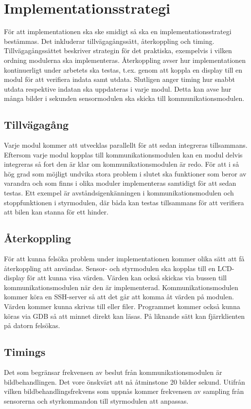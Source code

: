 \documentclass[designspec/spec.tex]{subfiles}
\begin{document}
\section{Implementationsstrategi}

För att implementationen ska ske smidigt så ska en implementationsstrategi
bestämmas. Det inkluderar tillvägagångssätt, återkoppling och timing.
Tillvägagångssättet beskriver strategin för det praktiska, exempelvis i vilken
ordning modulerna ska implementeras. Återkoppling avser hur implementationen
kontinuerligt under arbetets ska testas, t.ex. genom att koppla en display till
en modul för att verifiera indata samt utdata.
Slutligen anger timing hur snabbt utdata respektive indatan ska
uppdateras i varje modul. Detta kan avse hur många bilder i sekunden
sensormodulen ska skicka till kommunikationsmodulen. 

\subsection{Tillvägagång}
Varje modul kommer att utvecklas parallellt för att sedan integreras
tillsammans. Eftersom varje modul kopplas till kommunikationsmodulen kan en
modul delvis integreras så fort den är klar om kommunikationsmodulen är
redo. För att i så hög grad som möjligt undvika stora problem i slutet ska
funktioner som beror av varandra och som finns i olika moduler implementeras
samtidigt för att sedan testas. Ett exempel är avståndsigenkänningen i
kommunikationsmodulen och stoppfunktionen i styrmodulen, där båda kan testas
tillsammans för att verifiera att bilen kan stanna för ett hinder.

\subsection{Återkoppling}
För att kunna felsöka problem under implementationen kommer olika sätt att få
återkoppling att användas. Sensor- och styrmodulen ska kopplas till en
LCD-display för att kunna visa värden. Värden kan också skickas via bussen till
kommunikationsmodulen när den är implementerad. Kommunikationsmodulen kommer
köra en SSH-server så att det går att komma åt värden på modulen. Värden kommer
kunna skrivas till  eller filer. Programmet kommer också kunna
köras via GDB så att minnet direkt kan läsas. På liknande sätt kan
fjärrklienten på datorn felsökas.

\subsection{Timings}
Det som begränsar frekvensen av beslut från kommunikationsmodulen är
bildbehandlingen. Det vore önskvärt att nå åtminstone 20 bilder sekund. Utifrån
vilken bildbehandlingsfrekvens som uppnås kommer frekvensen av sampling från
sensorerna och styrkommandon till styrmodulen att anpassas. 
\end{document}
